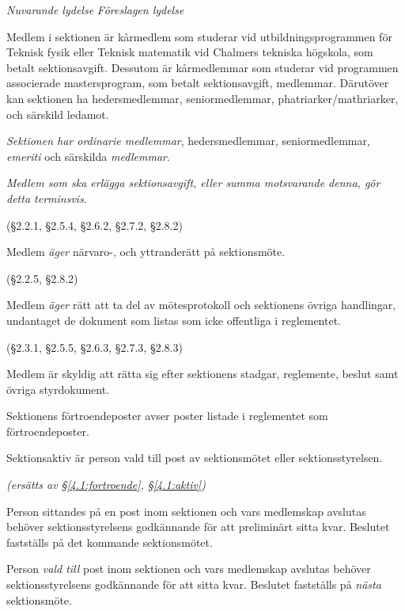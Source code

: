 \documentclass{article}
\newenvironment{lydelse}
    {\begin{paracol}{2}%
        \emph{Nuvarande lydelse}%
        \switchcolumn%
        \emph{Föreslagen lydelse}%
    \end{paracol}%
    \begin{enumerate}[label=\thesubsection.\arabic*]%
    \begin{paracol}{2}%
    }{\end{paracol}\end{enumerate}}
\begin{document}
\begin{lydelse}
    \item Medlem i sektionen är kårmedlem som studerar vid utbildningsprogrammen för Teknisk fysik eller Teknisk matematik vid Chalmers tekniska högskola, som betalt sektionsavgift. Dessutom är kårmedlemmar som studerar vid programmen associerade mastersprogram, som betalt sektionsavgift, medlemmar. Därutöver kan sektionen ha hedersmedlemmar, seniormedlemmar, phatri\-arker/\-mathri\-arker, och särskild ledamot.
    
\switchcolumn
    \setcounter{enumi}{0}
    \item \emph{Sektionen har ordinarie medlemmar}, hedersmedlemmar, seniormedlemmar, \emph{emeriti} och särskilda \emph{medlemmar}.
    
\switchcolumn*
\switchcolumn
    \item \emph{Medlem som ska erlägga sektionsavgift, eller summa motsvarande denna, gör detta terminsvis.}

\switchcolumn*
    (\S 2.2.1, \S 2.5.4, \S 2.6.2, \S 2.7.2, \S 2.8.2)
\switchcolumn
    \item Medlem \emph{äger} närvaro-, och yttranderätt på sektionsmöte.\label{2.1:närvaro}
    
\switchcolumn*
    (\S 2.2.5, \S 2.8.2)
\switchcolumn
    \item Medlem \emph{äger} rätt att ta del av mötesprotokoll och sektionens övriga handlingar, undantaget de dokument som listas som icke offentliga i reglementet.\label{2.1:offentlighet}
    
\switchcolumn*
    (\S 2.3.1, \S 2.5.5, \S 2.6.3, \S 2.7.3, \S 2.8.3)

\switchcolumn
    \item Medlem är skyldig att rätta sig efter sektionens stadgar, regle\-mente, beslut samt övriga styrdokument.\label{2.1:skyldig}
    
\switchcolumn*
    \setcounter{subsection}{4}
    \setcounter{enumi}{0}
    \item Sektionens förtroendeposter avser poster listade i reglementet som förtroendeposter.
    
    \item Sektionsaktiv är person vald till post av sektionsmötet eller sektionsstyrelsen.
    
\switchcolumn
    \emph{(ersätts av \S \ref{4.1:fortroende}, \S \ref{4.1:aktiv})}

\switchcolumn*
    \setcounter{subsection}{1}
    \setcounter{enumi}{1}
    \item Person sittandes på en post inom sektionen och vars medlemskap avslutas behöver sektionsstyrelsens godkännande för att preliminärt sitta kvar. Beslutet fastställs på det kommande sektionsmötet.

\switchcolumn
    \item Person \emph{vald till} post inom sektionen och vars medlemskap avslutas behöver sektionsstyrelsens godkännande för att sitta kvar.
    Beslutet fastställs på \emph{nästa} sektionsmöte.
\end{lydelse}
\end{document}
